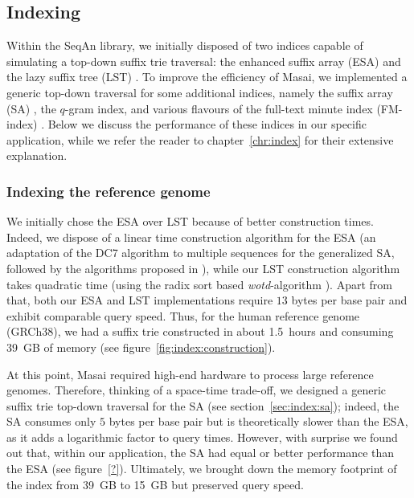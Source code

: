 \subsection{Indexing}
\label{masai:engineering:index}

Within the SeqAn library, we initially disposed of two indices capable of simulating a top-down suffix trie traversal: the enhanced suffix array (ESA) \citep{Abouelhoda2004} and the lazy suffix tree (LST) \citep{Giegerich1999}.
To improve the efficiency of Masai, we implemented a generic top-down traversal for some additional indices, namely the suffix array (SA) \citep{Manber1990}, the $q$-gram index, and various flavours of the full-text minute index (FM-index) \citep{Ferragina2001}.
Below we discuss the performance of these indices in our specific application, while we refer the reader to chapter~\ref{chr:index} for their extensive explanation.

\subsubsection{Indexing the reference genome}

We initially chose the ESA over LST because of better construction times.
Indeed, we dispose of a linear time construction algorithm for the ESA (an adaptation of the DC7 algorithm \citep{Dementiev2008} to multiple sequences \citep{Weese2013} for the generalized SA, followed by the algorithms proposed in \citep{Kasai2001,Abouelhoda2004}), while our LST construction algorithm takes quadratic time (using the radix sort based \emph{wotd}-algorithm \citep{Giegerich1999}).
Apart from that, both our ESA and LST implementations require $13$ bytes per base pair and exhibit comparable query speed.
Thus, for the human reference genome (GRCh38), we had a suffix trie constructed in about 1.5~hours and consuming 39~GB of memory (see figure~\ref{fig:index:construction}).

At this point, Masai required high-end hardware to process large reference genomes.
Therefore, thinking of a space-time trade-off, we designed a generic suffix trie top-down traversal for the SA (see section~\ref{sec:index:sa});
indeed, the SA consumes only $5$ bytes per base pair but is theoretically slower than the ESA, as it adds a logarithmic factor to query times.
However, with surprise we found out that, within our application, the SA had equal or better performance than the ESA (see figure~\ref{?}).
Ultimately, we brought down the memory footprint of the index from 39~GB to 15~GB but preserved query speed.

